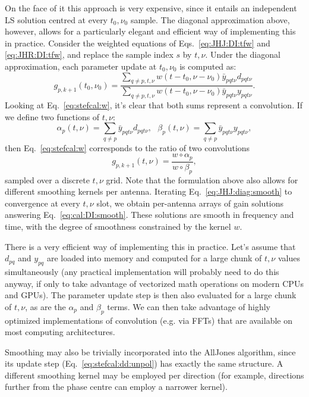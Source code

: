 \documentclass[useAMS,usenatbib]{mn2e}
\numberwithin{equation}{section}
\begin{document}
On the face of it this approach is very expensive, since it entails an independent LS solution centred at 
every $t_0,\nu_0$ sample. The diagonal approximation above, however, allows for a particularly elegant and efficient way of 
implementing this in practice. Consider the weighted equations of Eqs.~\ref{eq:JHJ:DI:tfw} and \ref{eq:JHR:DI:tfw}, 
and replace the sample index $s$ by $t,\nu$. Under the diagonal approximation, each parameter update at $t_0,\nu_0$ is 
computed as:
\begin{equation}
\label{eq:stefcal:w}
g_{p,{k+1}}(t_0,\nu_0) = \frac{\sum\limits_{q\ne p,t,\nu} w(t-t_0,\nu-\nu_0) \bar{y}_{pqt\nu} d_{pqt\nu} }
{\sum\limits_{q\ne p,t,\nu} w(t-t_0,\nu-\nu_0) \bar{y}_{pqt\nu} y_{pqt\nu}}.
\end{equation}
Looking at Eq.~\ref{eq:stefcal:w}, it's clear that both sums represent a convolution. If we define two functions of $t,\nu$:
\begin{equation}
\alpha_p(t,\nu) = \sum\limits_{q\ne p} \bar{y}_{pqt\nu} d_{pqt\nu},~~~
\beta_p(t,\nu) = \sum\limits_{q\ne p} \bar{y}_{pqt\nu} y_{pqt\nu},
\end{equation}
then Eq.~\ref{eq:stefcal:w} corresponds to the ratio of two convolutions
\begin{equation}
\label{eq:JHJ:diag:smooth}
g_{p,k+1}(t,\nu) = \frac{w\circ \alpha_p}{w\circ\beta_p},
\end{equation}
sampled over a discrete $t,\nu$ grid. Note that the formulation above also allows for different smoothing kernels per antenna.
Iterating Eq.~\ref{eq:JHJ:diag:smooth} to convergence at every $t,\nu$ slot, we obtain per-antenna arrays of gain solutions 
answering Eq.~\ref{eq:cal:DI:smooth}. These solutions are smooth in frequency and time, with the degree of smoothness 
constrained by the kernel $w$. 

There is a very efficient way of implementing this in practice. Let's assume that $d_{pq}$ and $y_{pq}$ are loaded into memory 
and computed for a large chunk of $t,\nu$ values simultaneously (any practical implementation will probably need to do this anyway, 
if only to take advantage of vectorized math operations on modern CPUs and GPUs). The parameter update step is then also evaluated
for a large chunk of $t,\nu$, as are the $\alpha_p$ and $\beta_p$ terms. We can then take advantage of highly optimized 
implementations of convolution (e.g. via FFTs) that are available on most computing architectures. 

Smoothing may also be trivially incorporated into the {\sc AllJones} algorithm, since its update step (Eq.~\ref{eq:stefcal:dd:unpol}) 
has exactly the same structure. A different smoothing kernel may be employed per direction (for example, directions further from 
the phase centre can employ a narrower kernel). 
\end{document}
